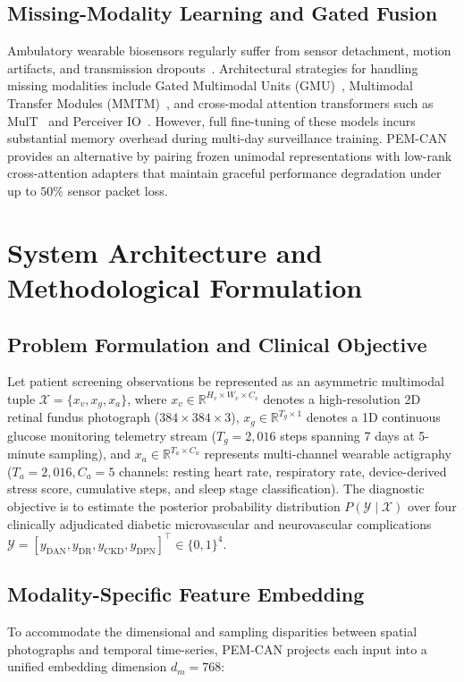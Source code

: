 \documentclass[a4paper,fleqn]{cas-dc}
\begin{document}
\subsection{Missing-Modality Learning and Gated Fusion}
Ambulatory wearable biosensors regularly suffer from sensor detachment, motion artifacts, and transmission dropouts~\cite{ma2023multimodal}. Architectural strategies for handling missing modalities include Gated Multimodal Units (GMU)~\cite{arevalo2017gmu}, Multimodal Transfer Modules (MMTM)~\cite{joze2020mmtm}, and cross-modal attention transformers such as MulT~\cite{tsai2019mult} and Perceiver IO~\cite{jaegle2021perceiver}. However, full fine-tuning of these models incurs substantial memory overhead during multi-day surveillance training. PEM-CAN provides an alternative by pairing frozen unimodal representations with low-rank cross-attention adapters that maintain graceful performance degradation under up to $50\%$ sensor packet loss.

\section{System Architecture and Methodological Formulation}
\label{sec:architecture}

\subsection{Problem Formulation and Clinical Objective}
\label{sec:problem_formulation}
Let patient screening observations be represented as an asymmetric multimodal tuple $\mathcal{X} = \{x_v, x_g, x_a\}$, where $x_v \in \mathbb{R}^{H_v \times W_v \times C_v}$ denotes a high-resolution 2D retinal fundus photograph ($384 \times 384 \times 3$), $x_g \in \mathbb{R}^{T_g \times 1}$ denotes a 1D continuous glucose monitoring telemetry stream ($T_g = 2{,}016$ steps spanning 7 days at 5-minute sampling), and $x_a \in \mathbb{R}^{T_a \times C_a}$ represents multi-channel wearable actigraphy ($T_a = 2{,}016, C_a = 5$ channels: resting heart rate, respiratory rate, device-derived stress score, cumulative steps, and sleep stage classification). The diagnostic objective is to estimate the posterior probability distribution $P(\mathcal{Y} \mid \mathcal{X})$ over four clinically adjudicated diabetic microvascular and neurovascular complications $\mathcal{Y} = [y_{\text{DAN}}, y_{\text{DR}}, y_{\text{CKD}}, y_{\text{DPN}}]^\top \in \{0, 1\}^4$.

\subsection{Modality-Specific Feature Embedding}
\label{sec:modality_embedding}
To accommodate the dimensional and sampling disparities between spatial photographs and temporal time-series, PEM-CAN projects each input into a unified embedding dimension $d_m = 768$:
\end{document}
